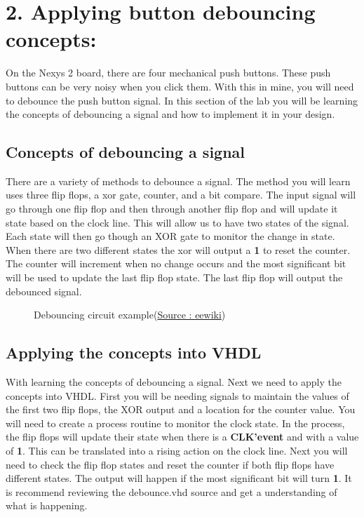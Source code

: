 \documentclass{article}
\begin{document}
\newpage

\section{2. Applying button debouncing concepts:}
On the Nexys 2 board, there are four mechanical push buttons. These push buttons can be very noisy when you click them. With this in mine, you will need to debounce the push button signal. In this section of the lab you will be learning the concepts of debouncing a signal and how to implement it in your design.

\subsection{Concepts of debouncing a signal}
There are a variety of methods to debounce a signal. The method you will learn uses three flip flops, a xor gate, counter, and a bit compare. The input signal will go through one flip flop and then through another flip flop and will update it state based on the clock line. This will allow us to have two states of the signal. Each state will then go though an XOR gate to monitor the change in state. When there are two different states the xor will output a \textbf{1} to reset the counter. The counter will increment when no change occurs and the most significant bit will be used to update the last flip flop state. The last flip flop will output the debounced signal.

\begin{figure}[!htb]
  \centering
  \caption{Debouncing circuit example(\href{http://eewiki.net/x/FgBM}{Source : eewiki})}
\end{figure}

\subsection{Applying the concepts into VHDL}
With learning the concepts of debouncing a signal. Next we need to apply the concepts into VHDL. First you will be needing signals to maintain the values of the first two flip flops, the XOR output and a location for the counter value. You will need to create a process routine to monitor the clock state. In the process, the flip flops will update their state when there is a \textbf{CLK'event} and with a value of \textbf{1}. This can be translated into a rising action on the clock line. Next you will need to check the flip flop states and reset the counter if both flip flops have different states. The output will happen if the most significant bit will turn \textbf{1}. It is recommend reviewing the debounce.vhd source and get a understanding of what is happening.
\end{document}
